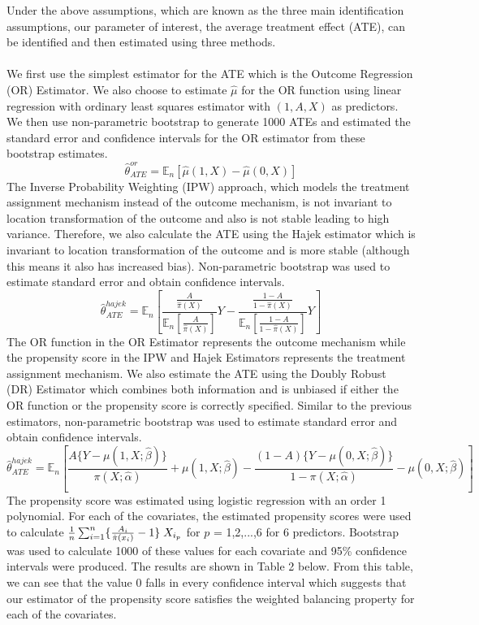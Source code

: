 \documentclass{article}
\newcommand{\E}{\mathbb{E}}
\begin{document}
Under the above assumptions, which are known as the three main identification assumptions, our parameter of interest, the average treatment effect (ATE), can be identified and then estimated using three methods.\\
\\
We first use the simplest estimator for the ATE which is the Outcome Regression (OR) Estimator. We also choose to estimate $\hat{\mu}$ for the OR function using linear regression with ordinary least squares estimator with $(1, A, X)$ as predictors. We then use non-parametric bootstrap to generate 1000 ATEs and estimated the standard error and confidence intervals for the OR estimator from these bootstrap estimates.
\[
\hat{\theta}_{ATE}^{or} = \E_n[\hat{\mu}(1,X) - \hat{\mu}(0,X)]
\]
The Inverse Probability Weighting (IPW) approach, which models the treatment assignment mechanism instead of the outcome mechanism, is not invariant to location transformation of the outcome and also is not stable leading to high variance. Therefore, we also calculate the ATE using the Hajek estimator which is invariant to location transformation of the outcome and is more stable (although this means it also has increased bias). Non-parametric bootstrap was used to estimate standard error and obtain confidence intervals.
\[
\hat{\theta}_{ATE}^{hajek} = \E_n\left[\frac{\frac{A}{\hat{\pi}(X)}}{\E_n[\frac{A}{\hat{\pi}(X)}]}Y - \frac{\frac{1-A}{1-\hat{\pi}(X)}}{\E_n[\frac{1-A}{1-\hat{\pi}(X)}]}Y\right]
\]
The OR function in the OR Estimator represents the outcome mechanism while the propensity score in the IPW and Hajek Estimators represents the treatment assignment mechanism. We also estimate the ATE using the Doubly Robust (DR) Estimator which combines both information and is unbiased if either the OR function or the propensity score is correctly specified. Similar to the previous estimators, non-parametric bootstrap was used to estimate standard error and obtain confidence intervals.
\[
\hat{\theta}_{ATE}^{hajek} = \E_n\left[\frac{A\{Y-\mu(1,X;\hat{\beta})\}}{\pi(X;\hat{\alpha})} + \mu(1,X;\hat{\beta}) - \frac{(1-A)\{Y-\mu(0,X;\hat{\beta})\}}{1-\pi(X;\hat{\alpha})} - \mu(0,X;\hat{\beta})\right]
\]
The propensity score was estimated using logistic regression with an order 1 polynomial. For each of the covariates, the estimated propensity scores were used to calculate $\frac{1}{n}\sum_{i=1}^{n}\{\frac{A_i}{\hat{\pi}(x_i)}-1\}\hspace{0.1cm}X_{i_{p}}$ for $p$ = 1,2,...,6 for 6 predictors. Bootstrap was used to calculate 1000 of these values for each covariate and 95\% confidence intervals were produced. The results are shown in Table 2 below. From this table, we can see that the value 0 falls in every confidence interval which suggests that our estimator of the propensity score satisfies the weighted balancing property for each of the covariates.
\end{document}
